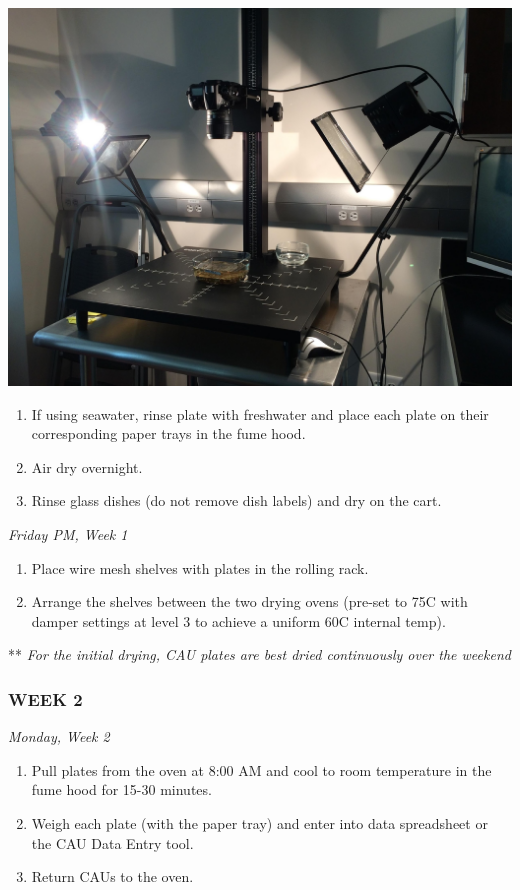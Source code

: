 \documentclass[]{book}
\providecommand{\tightlist}{%
  \setlength{\itemsep}{0pt}\setlength{\parskip}{0pt}}
\begin{document}
\includegraphics{images/Camera9.jpg}

\begin{enumerate}
\def\labelenumi{\arabic{enumi}.}
\setcounter{enumi}{2}
\tightlist
\item
  If using seawater, rinse plate with freshwater and place each plate on their corresponding paper trays in the fume hood.
\item
  Air dry overnight.
\item
  Rinse glass dishes (do not remove dish labels) and dry on the cart.
\end{enumerate}

\emph{Friday PM, Week 1}

\begin{enumerate}
\def\labelenumi{\arabic{enumi}.}
\tightlist
\item
  Place wire mesh shelves with plates in the rolling rack.
\item
  Arrange the shelves between the two drying ovens (pre-set to 75C with damper settings at level 3 to achieve a uniform 60C internal temp).
\end{enumerate}

** \emph{For the initial drying, CAU plates are best dried continuously over the weekend}

\hypertarget{week-2}{%
\subsubsection{WEEK 2}\label{week-2}}

\emph{Monday, Week 2}

\begin{enumerate}
\def\labelenumi{\arabic{enumi}.}
\tightlist
\item
  Pull plates from the oven at 8:00 AM and cool to room temperature in the fume hood for 15-30 minutes.
\item
  Weigh each plate (with the paper tray) and enter into data spreadsheet or the CAU Data Entry tool.
\item
  Return CAUs to the oven.
\end{enumerate}
\end{document}
